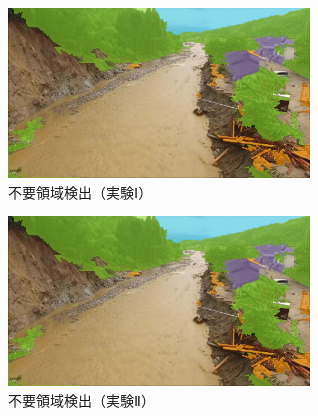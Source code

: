 \documentclass[../Thesis]{subfiles}
\begin{document}
\begin{figure}[h]
	\centering
	\includegraphics[width=8cm]{img/rejection1.png}
	\caption{不要領域検出（実験Ⅰ）}
	\label{img11}
\end{figure}
\begin{figure}[h]
	\centering
	\includegraphics[width=8cm]{img/rejection1.png}
	\caption{不要領域検出（実験Ⅱ）}
	\label{img12}
\end{figure}




\end{document}

